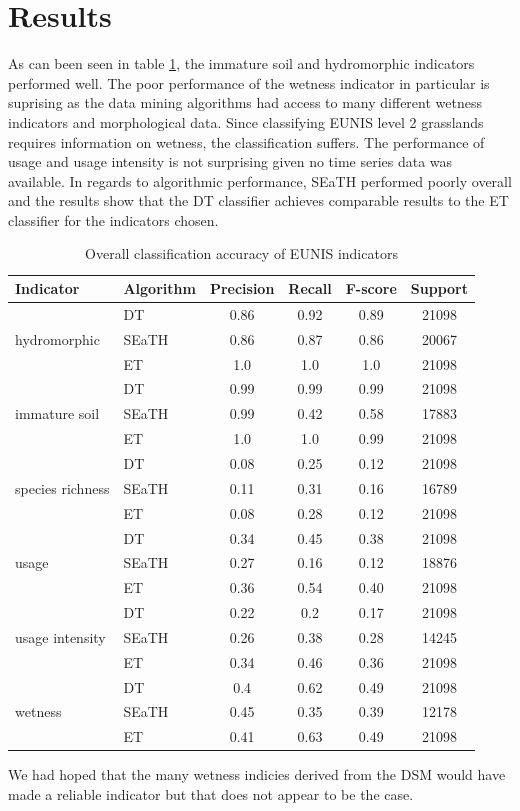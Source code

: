 \documentclass[authoryear, review,12pt,number]{elsarticle}
\begin{document}
{\section{Results}
As can been seen in table \ref{tab_accuracy_indicators}, the immature soil and
hydromorphic indicators performed well. The poor performance of the wetness
indicator in particular is suprising as the data mining algorithms had access to
many different wetness indicators and morphological data. Since classifying
EUNIS level 2 grasslands requires information on wetness, the classification
suffers. The performance of usage and usage intensity is not surprising given no
time series data was available. In regards to algorithmic performance, SEaTH
performed poorly overall and the results show that the DT classifier achieves comparable
results to the ET classifier for the indicators chosen. 
\begin{table}
    \centering
    \begin{tabular}{l l c c c c}
    Indicator & Algorithm & Precision & Recall & F-score & 
    Support\\
    \hline
    \multirow{3}{*}{hydromorphic}
    & DT & 0.86 & 0.92 & 0.89 & 21098\\
    & SEaTH & 0.86 & 0.87 & 0.86 & 20067\\
    & ET & 1.0 & 1.0 & 1.0 & 21098\\
    \cline{2-6}
    \multirow{3}{*}{immature soil}
    & DT & 0.99 & 0.99 & 0.99 & 21098\\
    & SEaTH & 0.99 & 0.42 & 0.58 & 17883\\
    & ET & 1.0 & 1.0 & 0.99 & 21098\\
    \cline{2-6}
    \multirow{3}{*}{species richness}
    & DT & 0.08 & 0.25 & 0.12 & 21098\\
    & SEaTH & 0.11 & 0.31 & 0.16 & 16789\\
    & ET & 0.08 & 0.28 & 0.12 & 21098\\
    \cline{2-6}
    \multirow{3}{*}{usage}
    & DT & 0.34 & 0.45 & 0.38 & 21098\\
    & SEaTH & 0.27 & 0.16 & 0.12 & 18876\\
    & ET & 0.36 & 0.54 & 0.40 & 21098\\
    \cline{2-6}
    \multirow{3}{*}{usage intensity}
    & DT & 0.22 & 0.2 & 0.17 & 21098\\
    & SEaTH & 0.26 & 0.38 & 0.28 & 14245\\
    & ET & 0.34 & 0.46 & 0.36 & 21098\\
    \cline{2-6}
    \multirow{3}{*}{wetness}
    & DT & 0.4 & 0.62 & 0.49 & 21098\\
    & SEaTH & 0.45 & 0.35 & 0.39 & 12178\\
    & ET & 0.41 & 0.63 & 0.49 & 21098\\
    \end{tabular}
    \label{tab:classification_EUNIS}
    \caption{Overall classification accuracy of EUNIS indicators}
    \label{tab_accuracy_indicators}
\end{table}
We had hoped that the many wetness indicies derived from the DSM would have made
a reliable indicator but that does not appear to be the case. 
}
\end{document}
